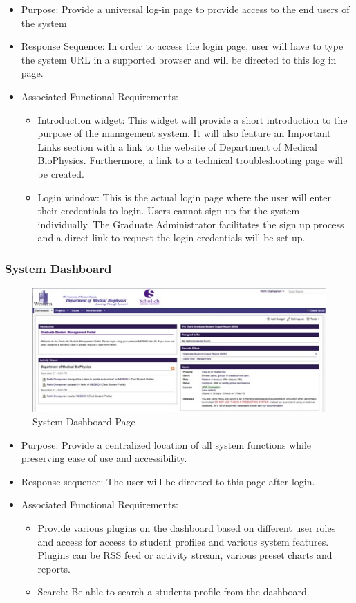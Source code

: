 \documentclass[11pt,a4paper]{report}
\begin{document}
\begin{itemize}
\item Purpose: Provide a universal log-in page to provide access to the end users of the system
\item Response Sequence: In order to access the login page, user will have to type the system URL in a supported browser and will be directed to this log in page. 
\item Associated Functional Requirements: 
\begin {itemize} 
\item Introduction widget: This widget will provide a short introduction to the purpose of the management system. It will also feature an Important Links section with a link to the website of Department of Medical BioPhysics. Furthermore, a link to a technical troubleshooting page will be created.
\item Login window: This is the actual login page where the user will enter their credentials to login. Users cannot sign up for the system individually. The Graduate Administrator facilitates the sign up process and a direct link to request the login credentials will be set up.
\end{itemize}
\end{itemize}


\subsubsection{System Dashboard}
\begin{figure}[htp]
\centering
\includegraphics[scale=1]{diagrams/HTMLTemplating/Figure2.jpg}
\caption{System Dashboard Page}
\label{fig:SystemDashBoard}
\end{figure}

\begin{itemize}
\item Purpose: Provide a centralized location of all system functions while preserving ease of use and accessibility.
\item Response sequence: The user will be directed to this page after login.
\item Associated Functional Requirements:
\begin{itemize}
\item Provide various plugins on the dashboard based on different user roles and access for access to student profiles and various system features. Plugins can be RSS feed or activity stream, various preset charts and reports.
\item Search: Be able to search a students profile from the dashboard.
\end{itemize}
\end{itemize}
\end{document}
